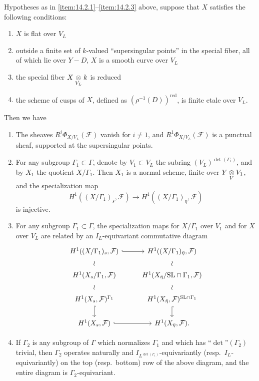 \begin{theorem}\label{thm:14.2.4}
Hypotheses as in \ref{item:14.2.1}--\ref{item:14.2.3} above, suppose that $X$ satisfies the following conditions:
\begin{enumerate}[label=\arabic*)]
\item $X$ is flat over $V_L$
\item outside a finite set of $k$-valued ``supersingular points'' in the special fiber, all of which lie over $Y - D$, $X$ is a smooth curve over $V_L$
\item the special fiber $X \underset{V_L}{\otimes} k$ is reduced
\item the scheme of cusps of $X$, defined as $(\rho^{-1}(D))^{\mathrm{red}}$, is finite etale over $V_L$.
\end{enumerate}
Then we have
\begin{enumerate}[label=\arabic*)]
\item The sheaves $R^i \Phi_{X/V_L}(\mathcal{F})$ vanish for $i \neq 1$, and $R^1 \Phi_{X/V_L}(\mathcal{F})$ is a punctual sheaf, supported at the supersingular points.
\item For any subgroup $\Gamma_1 \subset \Gamma$, denote by $V_1 \subset V_L$ the subring $(V_L)^{\det(\Gamma_1)}$, and by $X_1$ the quotient $X/\Gamma_1$. Then $X_1$ is a normal scheme, finite over $Y \underset{V}{\otimes} V_1$, and the specialization map
\[
H^1((X/\Gamma_1)_s, \mathcal{F}) \to H^1((X/\Gamma_1)_{\bar{\eta}}, \mathcal{F})
\]
is injective.
\item For any subgroup $\Gamma_1 \subset \Gamma$, the specialization maps for $X/\Gamma_1$ over $V_1$ and for $X$ over $V_L$ are related by an $I_L$-equivariant commutative diagram
\[
\begin{tikzcd}[row sep=1.6em, column sep=2.5em]
H^1((X/\Gamma_1)_s, \mathcal{F}) \arrow[r, hook] \arrow[d, phantom, "\wr"] & H^1((X/\Gamma_1)_{\bar{\eta}}, \mathcal{F}) \arrow[d, phantom, "\wr"] \\
H^1(X_s/\Gamma_1, \mathcal{F}) \arrow[d, phantom, "\wr"] & H^1(X_{\bar{\eta}}/\mathrm{SL} \cap \Gamma_1, \mathcal{F}) \arrow[d, phantom, "\wr"] \\
H^1(X_s, \mathcal{F})^{\Gamma_1} \arrow[d, hook] & H^1(X_{\bar{\eta}}, \mathcal{F})^{\mathrm{SL} \cap \Gamma_1} \arrow[d, hook] \\
H^1(X_s, \mathcal{F}) \arrow[r, hook] & H^1(X_{\bar{\eta}}, \mathcal{F}) .
\end{tikzcd}
\]
\item If $\Gamma_2$ is any subgroup of $\Gamma$ which normalizes $\Gamma_1$ and which has ``$\det$''$(\Gamma_2)$ trivial, then $\Gamma_2$ operates naturally and $I_{L^{\det(\Gamma_1)}}$-equivariantly (resp.\ $I_L$-equivariantly) on the top (resp.\ bottom) row of the above diagram, and the entire diagram is $\Gamma_2$-equivariant.
\end{enumerate}
\end{theorem}

